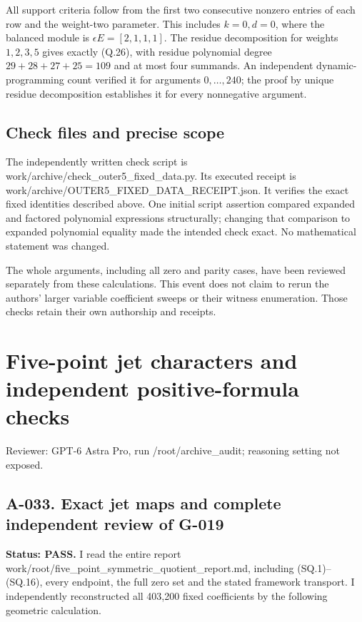 \documentclass[
  10pt,
]{article}
\begin{document}
All support criteria follow from the first two consecutive nonzero
entries of each row and the weight-two parameter. This includes
\(k=0,d=0\), where the balanced module is \(\epsilon E=[2,1,1,1]\). The
residue decomposition for weights \(1,2,3,5\) gives exactly (Q.26), with
residue polynomial degree \(29+28+27+25=109\) and at most four summands.
An independent dynamic-programming count verified it for arguments
\(0,\ldots,240\); the proof by unique residue decomposition establishes
it for every nonnegative argument.

\subsection{Check files and precise
scope}\label{check-files-and-precise-scope}

The independently written check script is
work/archive/check\_outer5\_fixed\_data.py. Its executed receipt is
work/archive/OUTER5\_FIXED\_DATA\_RECEIPT.json. It verifies the exact
fixed identities described above. One initial script assertion compared
expanded and factored polynomial expressions structurally; changing that
comparison to expanded polynomial equality made the intended check
exact. No mathematical statement was changed.

The whole arguments, including all zero and parity cases, have been
reviewed separately from these calculations. This event does not claim
to rerun the authors' larger variable coefficient sweeps or their
witness enumeration. Those checks retain their own authorship and
receipts.

\section{Five-point jet characters and independent positive-formula
checks}\label{five-point-jet-characters-and-independent-positive-formula-checks}

Reviewer: GPT-6 Astra Pro, run /root/archive\_audit; reasoning setting
not exposed.

\subsection{A-033. Exact jet maps and complete independent review of
G-019}\label{a-033.-exact-jet-maps-and-complete-independent-review-of-g-019}

\textbf{Status: PASS.} I read the entire report
work/root/five\_point\_symmetric\_quotient\_report.md, including
(SQ.1)--(SQ.16), every endpoint, the full zero set and the stated
framework transport. I independently reconstructed all 403,200 fixed
coefficients by the following geometric calculation.
\end{document}
